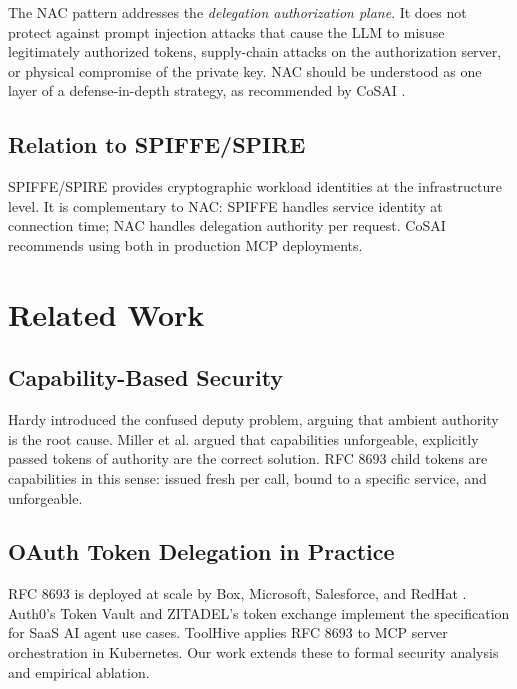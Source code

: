 \documentclass[journal]{IEEEtran}
\begin{document}
The NAC pattern addresses the \textit{delegation authorization plane}. It does
not protect against prompt injection attacks that cause the LLM to misuse
legitimately authorized tokens, supply-chain attacks on the authorization server,
or physical compromise of the private key. NAC should be understood as one layer
of a defense-in-depth strategy, as recommended by CoSAI \cite{cosai_mcp}.

\subsection{Relation to SPIFFE/SPIRE}

SPIFFE/SPIRE \cite{spiffe} provides cryptographic workload identities at the
infrastructure level. It is complementary to NAC: SPIFFE handles service
identity at connection time; NAC handles delegation authority per request. CoSAI
\cite{cosai_mcp} recommends using both in production MCP deployments.


\FloatBarrier  %

\section{Related Work}
\label{sec:related}

\subsection{Capability-Based Security}

Hardy \cite{hardy1988} introduced the confused deputy problem, arguing that
ambient authority is the root cause. Miller et al. \cite{miller2003} argued that
capabilities unforgeable, explicitly passed tokens of authority are the
correct solution. RFC 8693 child tokens are capabilities in this sense: issued
fresh per call, bound to a specific service, and unforgeable.

\subsection{OAuth Token Delegation in Practice}

RFC 8693 \cite{rfc8693} is deployed at scale by Box, Microsoft, Salesforce, and
RedHat \cite{rfc8693_deploy}. Auth0's Token Vault \cite{auth0_token_vault} and
ZITADEL's token exchange \cite{zitadel_te} implement the specification for SaaS
AI agent use cases. ToolHive \cite{toolhive} applies RFC 8693 to MCP server
orchestration in Kubernetes. Our work extends these to formal security analysis
and empirical ablation.
\end{document}
